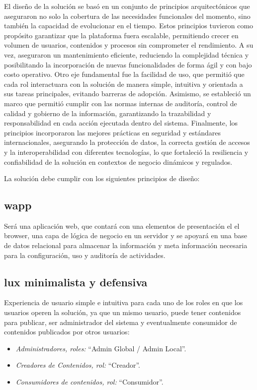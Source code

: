 El diseño de la solución se basó en un conjunto de principios arquitectónicos que aseguraron no solo la cobertura de las necesidades funcionales del momento, sino también la capacidad de evolucionar en el tiempo. Estos principios tuvieron como propósito garantizar que la plataforma fuera escalable, permitiendo crecer en volumen de usuarios, contenidos y procesos sin comprometer el rendimiento. A su vez, aseguraron un mantenimiento eficiente, reduciendo la complejidad técnica y posibilitando la incorporación de nuevas funcionalidades de forma ágil y con bajo costo operativo.
Otro eje fundamental fue la facilidad de uso, que permitió que cada rol interactuara con la solución de manera simple, intuitiva y orientada a sus tareas principales, evitando barreras de adopción. Asimismo, se estableció un marco que permitió cumplir con las normas internas de auditoría, control de calidad y gobierno de la información, garantizando la trazabilidad y responsabilidad en cada acción ejecutada dentro del sistema.
Finalmente, los principios incorporaron las mejores prácticas en seguridad y estándares internacionales, asegurando la protección de datos, la correcta gestión de accesos y la interoperabilidad con diferentes tecnologías, lo que fortaleció la resiliencia y confiabilidad de la solución en contextos de negocio dinámicos y regulados.

La solución debe cumplir con los siguientes principios de diseño:

\subsection{\Gls{wapp}}
\label{principios:webapp}
Será una aplicación web, que contará con una elementos de presentación el el browser, una capa de lógica de negocio en un servidor y se apoyará en una base de datos relacional para almacenar la información y meta información necesaria para la configuración, uso y auditoría de actividades.

\subsection{\gls{lux} minimalista y defensiva}
\label{principios:leanUx}
Experiencia de usuario simple e intuitiva para cada uno de los roles en que los usuarios operen la solución, ya que un mismo usuario, puede tener contenidos para publicar, ser administrador del sistema y eventualmente consumidor de contenidos publicados por otros usuarios:
\begin{itemize}
\item \textit{Administradores, roles:} “Admin Global / Admin Local”.
\item \textit{Creadores de Contenidos, rol:} “Creador”.
\item \textit{Consumidores de contenidos, rol:} “Consumidor”.
\end{itemize}

